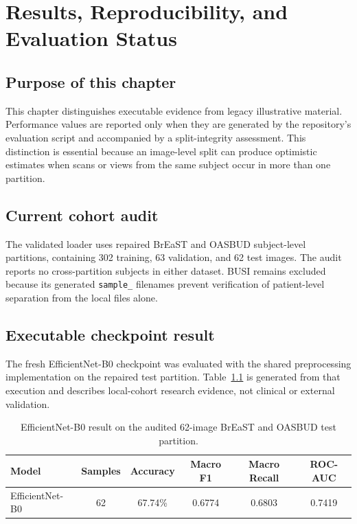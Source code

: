 \chapter[Results and Evaluation Status]{Results, Reproducibility, and Evaluation Status}
\label{ch:results}

\section{Purpose of this chapter}
This chapter distinguishes executable evidence from legacy illustrative material. Performance values are reported only when they are generated by the repository's evaluation script and accompanied by a split-integrity assessment. This distinction is essential because an image-level split can produce optimistic estimates when scans or views from the same subject occur in more than one partition.

\section{Current cohort audit}
The validated loader uses repaired BrEaST and OASBUD subject-level partitions, containing 302 training, 63 validation, and 62 test images. The audit reports no cross-partition subjects in either dataset. BUSI remains excluded because its generated \texttt{sample\_} filenames prevent verification of patient-level separation from the local files alone.

\section{Executable checkpoint result}
The fresh EfficientNet-B0 checkpoint was evaluated with the shared preprocessing implementation on the repaired test partition. Table~\ref{tab:provisional_result} is generated from that execution and describes local-cohort research evidence, not clinical or external validation.

\begin{table}[htbp]
\centering
\caption{EfficientNet-B0 result on the audited 62-image BrEaST and OASBUD test partition.}
\label{tab:provisional_result}
\begin{tabular}{@{}lccccc@{}}
\toprule
\textbf{Model} & \textbf{Samples} & \textbf{Accuracy} & \textbf{Macro F1} & \textbf{Macro Recall} & \textbf{ROC-AUC} \\ \midrule
EfficientNet-B0 & 62 & 67.74\% & 0.6774 & 0.6803 & 0.7419 \\ \bottomrule
\end{tabular}
\end{table}


